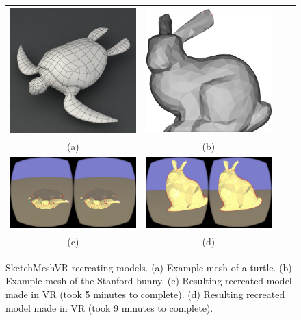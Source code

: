 \begin{figure}[!h]
    \centering
    \setlength{\tabcolsep}{0.0130\linewidth}
    \begin{tabular}{@{}cccc@{}}
    \includegraphics[width=0.45\linewidth]{figures/example_model_turtle}&
        \includegraphics[width=0.45\linewidth]{figures/example_model_bunny}\\
    (a)&(b)\\

  	\includegraphics[width=0.48\linewidth]{figures/results_turtle_model}&
  	\includegraphics[width=0.48\linewidth]{figures/results_bunny_model}\\
(c)&(d)\\
    \end{tabular}
    \caption[SketchMeshVR turtle and Stanford bunny model]{SketchMeshVR recreating models.
    	  \textup{(a)} Example mesh of a turtle.
    	  \textup{(b)} Example mesh of the Stanford bunny.
	  \textup{(c)} Resulting recreated model made in VR (took 5 minutes to complete).
	  \textup{(d)} Resulting recreated model made in VR (took 9 minutes to complete).
      \label{fig:recreate_turtle_bunny}}
\end{figure}

